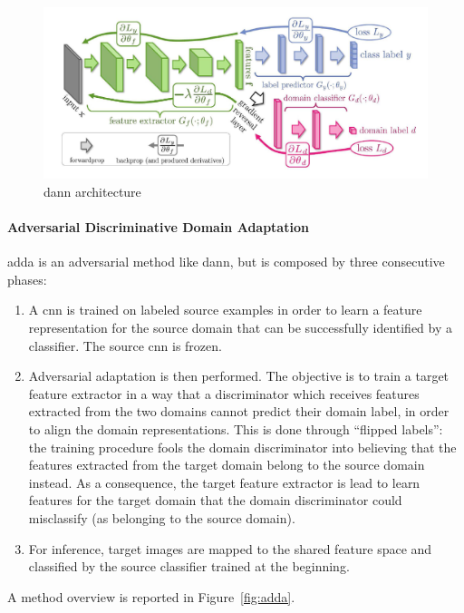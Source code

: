 \documentclass[%
    corpo=12pt,
    twoside,
    stile=classica,   
    tipotesi=magistrale,
    evenboxes,
    english
]{toptesi}
\begin{document}
\begin{figure}[ht!]
	\centering
	\includegraphics[width=0.8\linewidth]{imgs/dann.png}
	\caption{\gls{dann} architecture\cite{ganin2015unsupervised}}
	\label{fig:dann}
\end{figure}


\paragraph{Adversarial Discriminative Domain Adaptation}\label{sec:adda}
\gls{adda}\cite{tzeng2017adversarial} is an adversarial method like \gls{dann}, but is composed by three consecutive phases:
\begin{enumerate}
	\item A \gls{cnn} is trained on labeled source examples in order to learn a feature representation for the source domain that can be successfully identified by a classifier. The source \gls{cnn} is frozen.
	\item Adversarial adaptation is then performed. The objective is to train a target feature extractor in a way that a discriminator which receives features extracted from the two domains cannot predict their domain label, in order to align the domain representations. This is done through \textquotedblleft flipped labels\textquotedblright : the training procedure fools the domain discriminator into believing that the features ex\-trac\-ted from the target domain belong to the source domain instead. As a consequence, the target feature extractor is lead to learn features for the target domain that the domain discriminator could misclassify (as belonging to the source domain).
	\item For inference, target images are mapped to the shared feature space and classified by the source classifier trained at the beginning.
\end{enumerate}
A method overview is reported in Figure~\ref{fig:adda}.
\end{document}
